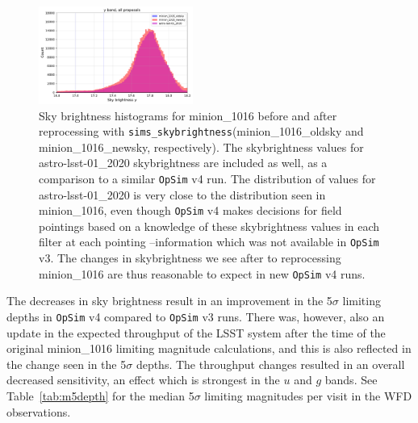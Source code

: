 \documentclass[DM,authoryear,toc]{lsstdoc}
\newcommand{\opsim}{\texttt{OpSim}\xspace}
\newcommand{\simsky}{\texttt{sims\_skybrightness}\xspace}
\begin{document}
\begin{figure}[ht]
\includegraphics[width=0.45\textwidth]{figures/skybrightness_y_band_ONED_ComboBinnedData}
\caption{Sky brightness histograms for minion\_1016 before and after  reprocessing with \simsky (minion\_1016\_oldsky and minion\_1016\_newsky, respectively).  The skybrightness values for astro-lsst-01\_2020 skybrightness are included as well, as a comparison to a similar \opsim v4 run. The distribution of values for astro-lsst-01\_2020 is very close to the distribution seen in minion\_1016, even though \opsim v4 makes decisions for field pointings based on a knowledge of these skybrightness values in each filter at each pointing --information which was not available in \opsim v3. The changes in skybrightness we see after to reprocessing minion\_1016 are thus reasonable to expect in new \opsim v4 runs.
\label{fig:skybrightness}}
\end{figure}

The decreases in sky brightness result in an improvement in the 5$\sigma$ limiting depths in \opsim v4 compared to \opsim v3 runs. There was, however, also an update in the expected throughput of the LSST system after the time of the original minion\_1016 limiting magnitude calculations, and this is also reflected in the change seen in the 5$\sigma$ depths. The throughput changes resulted in an overall decreased sensitivity, an effect which is strongest in the $u$ and $g$ bands. See Table~\ref{tab:m5depth} for the median 5$\sigma$ limiting magnitudes per visit in the WFD observations.
\end{document}
